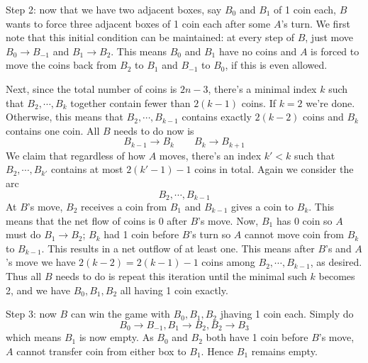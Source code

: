 \documentclass[11pt,a4paper]{article}
\begin{document}
\begin{enumerate}
		Step 2: now that we have two adjacent boxes, say $B_0$ and $B_1$ of 1 coin each, $B$ wants to force three adjacent boxes of 1 coin each after some $A$'s turn. 
		We first note that this initial condition can be maintained: at every step of $B$, just move $B_0\to B_{-1}$ and $B_1\to B_2$. This means $B_0$ and $B_1$ have no coins and $A$ is forced to move the coins back from $B_2$ to $B_1$ and $B_{-1}$ to $B_0$, if this is even allowed. 
		
		Next, since the total number of coins is $2n-3$, there's a minimal index $k$ such that $B_2, \cdots , B_k$ together contain fewer than $2(k-1)$ coins. If $k=2$ we're done. Otherwise, this means that $B_2, \cdots, B_{k-1}$ contains exactly $2(k-2)$ coins and $B_k$ contains one coin. All $B$ needs to do now is 
		\[
		B_{k-1}\to B_{k}\qquad B_k\to B_{k+1}
		\]
		We claim that regardless of how $A$ moves, there's an index $k'<k$ such that $B_2, \cdots , B_{k'}$ contains at most $2(k'-1)-1$ coins in total. Again we consider the arc 
		\[
		B_2, \cdots, B_{k-1}
		\]
		At $B$'s move, $B_2$ receives a coin from $B_1$ and $B_{k-1}$ gives a coin to $B_k$. This means that the net flow of coins is 0 after $B$'s move. Now, $B_1$ has 0 coin so $A$ must do $B_1\to B_2$; $B_k$ had 1 coin before $B$'s turn so $A$ cannot move coin from $B_k$ to $B_{k-1}$. This results in a net outflow of at least one. This means after $B$'s and $A$'s move we have $2(k-2)=2(k-1)-1$ coins among $B_2, \cdots, B_{k-1}$, as desired. Thus all $B$ needs to do is repeat this iteration until the minimal such $k$ becomes 2, and we have $B_0, B_1, B_2$ all having 1 coin exactly. 
		
		Step 3: now $B$ can win the game with $B_0, B_1, B_2$ jhaving 1 coin each. Simply do 
		\[
		B_0\to B_{-1}, B_1\to B_2, B_2\to B_3
		\]
		which means $B_1$ is now empty. As $B_0$ and $B_2$ both have 1 coin before $B$'s move, $A$ cannot transfer coin from either box to $B_1$. Hence $B_1$ remains empty. 
		
	\end{enumerate}
	
\end{document}
